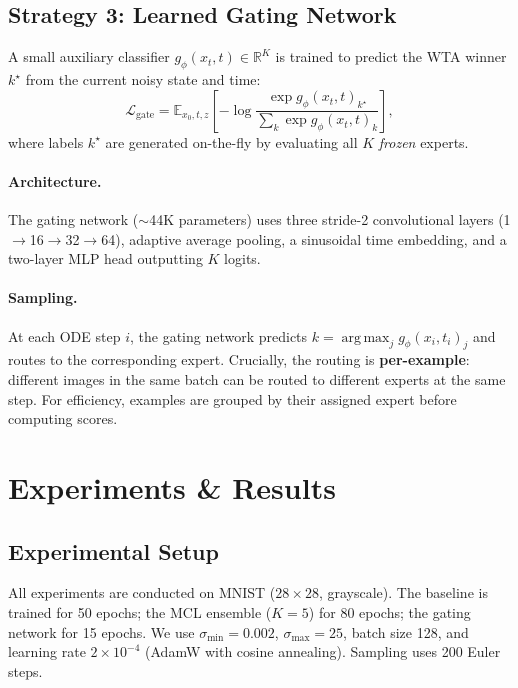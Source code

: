 \documentclass[11pt,a4paper]{article}
\newcommand{\R}{\mathbb{R}}
\newcommand{\E}{\mathbb{E}}
\DeclareMathOperator*{\argmax}{arg\,max}
\begin{document}
\subsection{Strategy 3: Learned Gating Network}

A small auxiliary classifier $g_\phi(x_t, t) \in \R^K$ is trained to
predict the WTA winner $k^\star$ from the current noisy state and time:
\begin{equation}
  \mathcal{L}_{\text{gate}} = \E_{x_0, t, z}\left[
    -\log \frac{\exp g_\phi(x_t, t)_{k^\star}}
    {\sum_k \exp g_\phi(x_t, t)_k}
  \right],
  \label{eq:gating_loss}
\end{equation}
where labels $k^\star$ are generated on-the-fly by evaluating all $K$
\emph{frozen} experts.

\paragraph{Architecture.} The gating network ($\sim$44K parameters) uses
three stride-2 convolutional layers (1$\to$16$\to$32$\to$64), adaptive
average pooling, a sinusoidal time embedding, and a two-layer MLP head
outputting $K$ logits.

\paragraph{Sampling.} At each ODE step $i$, the gating network predicts
$k = \argmax_j g_\phi(x_i, t_i)_j$ and routes to the corresponding
expert. Crucially, the routing is \textbf{per-example}: different images
in the same batch can be routed to different experts at the same step.
For efficiency, examples are grouped by their assigned expert before
computing scores.

\section{Experiments \& Results}
\label{sec:experiments}

\subsection{Experimental Setup}

All experiments are conducted on MNIST ($28 \times 28$, grayscale). The
baseline is trained for 50 epochs; the MCL ensemble ($K=5$) for 80 epochs;
the gating network for 15 epochs. We use $\sigma_{\min} = 0.002$,
$\sigma_{\max} = 25$, batch size 128, and learning rate $2 \times 10^{-4}$
(AdamW with cosine annealing). Sampling uses 200 Euler steps.
\end{document}
